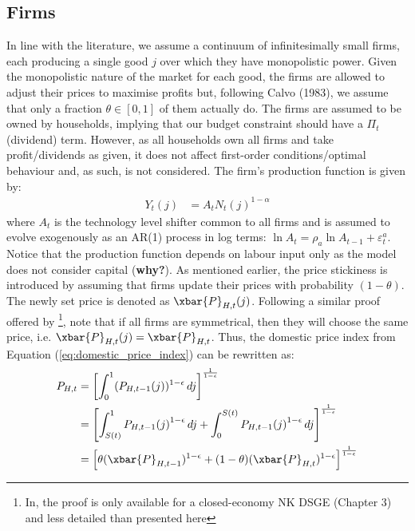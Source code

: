 \subsection{Firms}
In line with the literature, we assume a continuum of infinitesimally small firms, each producing a single good $j$ over which they have monopolistic power. Given the monopolistic nature of the market for each good, the firms are allowed to adjust their prices to maximise profits but, following Calvo (1983), we assume that only a fraction $\theta \in [0,1]$ of them actually do. The firms are assumed to be owned by households, implying that our budget constraint should have a $\Pi_t$ (dividend) term. However, as all households own all firms and take profit/dividends as given, it does not affect first-order conditions/optimal behaviour and, as such, is not considered. The firm's production function is given by: 
\begin{align}
    Y_t(j)   & = A_t {N_t(j)}^{1-\alpha}                         
\end{align}
where $A_t$ is the technology level shifter common to all firms and is assumed to evolve exogenously as an AR(1) process in log terms: $\ln A_t = \rho_a \ln A_{t-1} + \varepsilon^a_t$. Notice that the production function depends on labour input only as the model does not consider capital (\textbf{why?}). As mentioned earlier, the price stickiness is introduced by assuming that firms update their prices with probability $(1-\theta)$. The newly set price is denoted as $\xbar{P}_{H,t}(j)$. Following a similar proof offered by \textcite{jordigal_2015_monetary}\footnote{In, \textcite{jordigal_2015_monetary} the proof is only available for a closed-economy NK DSGE (Chapter 3) and less detailed than presented here}, note that if all firms are symmetrical, then they will choose the same price, i.e. $\xbar{P}_{H,t}(j) = \xbar{P}_{H,t}$. Thus, the domestic price index from Equation (\ref{eq:domestic_price_index}) can be rewritten as:
\begin{align}
    P_{H,t} &= \left[ \int_{0}^{1} (P_{H,t-1}(j))^{1-\epsilon} \, dj\right]^{\frac{1}{1-\epsilon}} \\
     &= \left[ \int_{S(t)}^{1} {P_{H,t-1}(j)}^{1-\epsilon} \, dj + \int_{0}^{S(t)}{P_{H,t-1}(j)}^{1-\epsilon} \, dj\right]^{\frac{1}{1-\epsilon}} \\
     &= \left[ \theta (\xbar{P}_{H,t-1})^{1-\epsilon} + (1-\theta)(\xbar{P}_{H,t})^{1-\epsilon} \right]^{\frac{1}{1-\epsilon}} \label{eq:price_dynamics_final_step}
\end{align}
